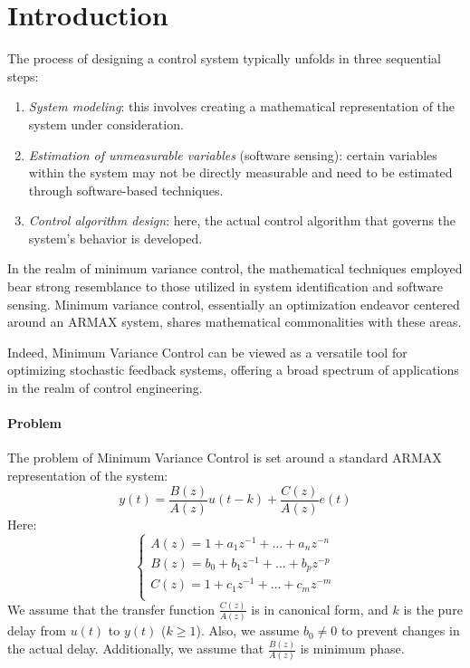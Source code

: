 \section{Introduction}

The process of designing a control system typically unfolds in three sequential steps:
\begin{enumerate}
    \item \textit{System modeling}: this involves creating a mathematical representation of the system under consideration.
    \item \textit{Estimation of unmeasurable variables} (software sensing): certain variables within the system may not be directly measurable and need to be estimated through software-based techniques.
    \item \textit{Control algorithm design}: here, the actual control algorithm that governs the system's behavior is developed.
\end{enumerate}
In the realm of minimum variance control, the mathematical techniques employed bear strong resemblance to those utilized in system identification and software sensing. 
Minimum variance control, essentially an optimization endeavor centered around an ARMAX system, shares mathematical commonalities with these areas.

Indeed, Minimum Variance Control can be viewed as a versatile tool for optimizing stochastic feedback systems, offering a broad spectrum of applications in the realm of control engineering.

\paragraph*{Problem}
The problem of Minimum Variance Control is set around a standard ARMAX representation of the system:
\[y(t)=\dfrac{B(z)}{A(z)}u(t-k)+\dfrac{C(z)}{A(z)}e(t)\]
Here: 
\[\begin{cases}
    A(z)=1+a_1z^{-1}+\dots+a_nz^{-n} \\
    B(z)=b_0+b_1z^{-1}+\dots+b_pz^{-p} \\
    C(z)=1+c_1z^{-1}+\dots+c_mz^{-m} \\
\end{cases}\]
We assume that the transfer function $\frac{C(z)}{A(z)}$ is in canonical form, and $k$ is the pure delay from $u(t)$ to $y(t)$ ($k \geq 1$). 
Also, we assume $b_0\neq 0$ to prevent changes in the actual delay. 
Additionally, we assume that $\frac{B(z)}{A(z)}$ is minimum phase. 

